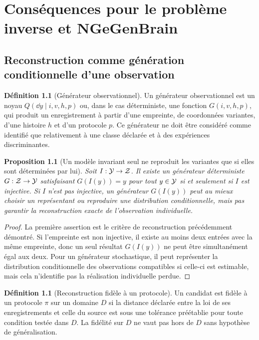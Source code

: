 \documentclass[11pt,oneside]{book}
\newtheorem{proposition}[theoreme]{Proposition}
\theoremstyle{definition}\newtheorem{definition}[theoreme]{Définition}\newtheorem{hypothese}[theoreme]{Hypothèse explicite}\newtheorem{convention}[theoreme]{Convention}\newtheorem{critere}[theoreme]{Critère}
\theoremstyle{remark}\newtheorem{remarque}[theoreme]{Remarque}\newtheorem{contreexemple}[theoreme]{Contre-exemple}
\begin{document}
\part{Conséquences pour le problème inverse et NGeGenBrain}
\chapter{Reconstruction comme génération conditionnelle d'une observation}
\begin{definition}[Générateur observationnel]
Un générateur observationnel est un noyau \(Q(\dd y\mid i,v,h,p)\) ou, dans le cas déterministe, une fonction \(G(i,v,h,p)\), qui produit un enregistrement à partir d'une empreinte, de coordonnées variantes, d'une histoire \(h\) et d'un protocole \(p\). Ce générateur ne doit être considéré comme identifié que relativement à une classe déclarée et à des expériences discriminantes.
\end{definition}
\begin{proposition}[Un modèle invariant seul ne reproduit les variantes que si elles sont déterminées par lui]
Soit \(I:\mathcal Y\to\mathcal Z\). Il existe un générateur déterministe \(G:\mathcal Z\to\mathcal Y\) satisfaisant \(G(I(y))=y\) pour tout \(y\in\mathcal Y\) si et seulement si \(I\) est injective. Si \(I\) n'est pas injective, un générateur \(G(I(y))\) peut au mieux choisir un représentant ou reproduire une distribution conditionnelle, mais pas garantir la reconstruction exacte de l'observation individuelle.
\end{proposition}
\begin{proof}
La première assertion est le critère de reconstruction précédemment démontré. Si l'empreinte est non injective, il existe au moins deux entrées avec la même empreinte, donc un seul résultat \(G(I(y))\) ne peut être simultanément égal aux deux. Pour un générateur stochastique, il peut représenter la distribution conditionnelle des observations compatibles si celle-ci est estimable, mais cela n'identifie pas la réalisation individuelle perdue.\end{proof}
\begin{definition}[Reconstruction fidèle à un protocole]
Un candidat est fidèle à un protocole \(\pi\) sur un domaine \(D\) si la distance déclarée entre la loi de ses enregistrements et celle du source est sous une tolérance préétablie pour toute condition testée dans \(D\). La fidélité sur \(D\) ne vaut pas hors de \(D\) sans hypothèse de généralisation.
\end{definition}
\end{document}
